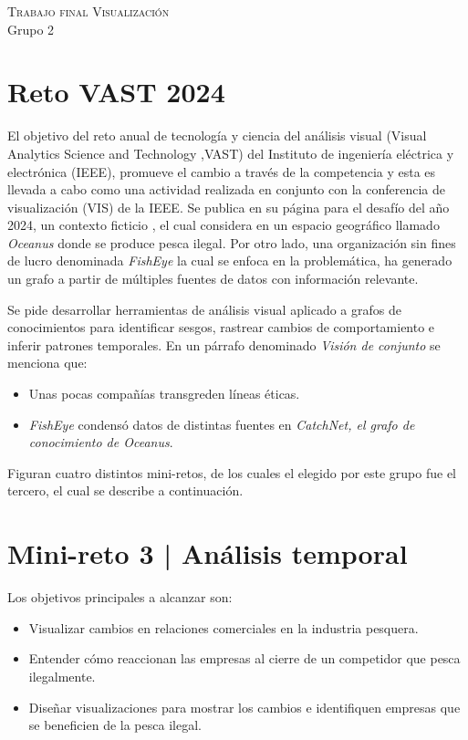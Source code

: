 \documentclass[11pt,spanish,a4paper]{article}
\begin{document}
\begin{center}
  \textsc{\large Trabajo final Visualización}\\
	Grupo 2
\end{center}

\section{Reto VAST 2024}
El objetivo del reto anual de tecnología y ciencia del análisis visual (Visual Analytics Science and Technology ,VAST) del Instituto de ingeniería eléctrica y electrónica (IEEE), promueve el cambio a través de la competencia y esta es llevada a cabo como una actividad realizada en conjunto con la conferencia de visualización (VIS) de la IEEE. Se publica en su página para el desafío del año 2024, un contexto ficticio  \cite{noauthor_vast_nodate}, el cual considera en un espacio geográfico llamado \emph{Oceanus} donde se produce pesca ilegal. Por otro lado, una organización sin fines de lucro denominada \emph{FishEye} la cual se enfoca en la problemática, ha generado un grafo a partir de múltiples fuentes de datos con información relevante.

Se pide desarrollar herramientas de análisis visual aplicado a grafos de conocimientos para identificar sesgos, rastrear cambios de comportamiento e inferir patrones temporales.
En un párrafo denominado \emph{Visión de conjunto} se menciona que:    
\begin{itemize}
	\item Unas pocas compañías transgreden líneas éticas.
	\item \emph{FishEye} condensó datos de distintas fuentes en \emph{CatchNet, el grafo de conocimiento de Oceanus}.
\end{itemize}

Figuran cuatro distintos mini-retos, de los cuales el elegido por este grupo fue el tercero, el cual se describe a continuación.

\section{Mini-reto 3 | Análisis temporal}
Los objetivos principales a alcanzar son:
\begin{itemize}
	\item Visualizar cambios en relaciones comerciales en la industria pesquera.
	\item Entender cómo reaccionan las empresas al cierre de un competidor que pesca ilegalmente.
	\item Diseñar visualizaciones para mostrar los cambios e identifiquen empresas que se beneficien de la pesca ilegal.
\end{itemize}
\end{document}
